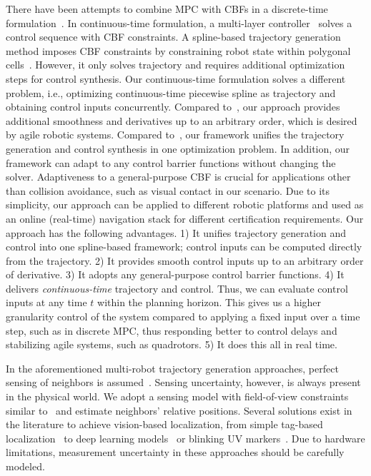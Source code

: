 There have been attempts to combine MPC with CBFs in a discrete-time formulation~\cite{liu2023iterative, zeng2021safety}. In continuous-time formulation, a multi-layer controller~\cite{sforni2024receding} solves a control sequence with CBF constraints. A spline-based trajectory generation method imposes CBF constraints by constraining robot state within polygonal cells~\cite{dickson2024spline}. However, it only solves trajectory and requires additional optimization steps for control synthesis. 
Our continuous-time formulation solves a different problem, i.e., optimizing continuous-time piecewise spline as trajectory and obtaining control inputs concurrently. Compared to~\cite{sforni2024receding}, our approach provides additional smoothness and derivatives up to an arbitrary order, which is desired by agile robotic systems. Compared to~\cite{dickson2024spline}, our framework unifies the trajectory generation and control synthesis in one optimization problem. In addition, our framework can adapt to any control barrier functions without changing the solver. Adaptiveness to a general-purpose CBF is crucial for applications other than collision avoidance, such as visual contact in our scenario. Due to its simplicity, our approach can be applied to different robotic platforms and used as an online (real-time) navigation stack for different certification requirements.
Our approach has the following advantages. 1) It unifies  trajectory generation and control into one spline-based framework; control inputs can be computed directly from the trajectory. 2) It provides smooth control inputs up to an arbitrary order of derivative. 3) It adopts any general-purpose control barrier functions. 4) It delivers \emph{continuous-time} trajectory and control. Thus, we can evaluate control inputs at any time $t$ within the planning horizon. This gives us a higher granularity control of the system compared to applying a fixed input over a time step, such as in discrete MPC, thus responding better to control delays and stabilizing agile systems, such as quadrotors. 5) It does this all in real time. 

In the aforementioned multi-robot trajectory generation approaches, perfect sensing of neighbors is assumed~\cite{csenbacslar2023rlss, zhou2017fast}. Sensing uncertainty, however, is always present in the physical world. We adopt a sensing model with field-of-view constraints similar to~\cite{catellani2023distributed} and estimate neighbors' relative positions. Several solutions exist in the literature to achieve vision-based localization, from simple tag-based localization~\cite{malyuta2020long} to deep learning models~\cite{ge2022vision} or blinking UV markers~\cite{walter2019uvdar}. Due to hardware limitations, measurement uncertainty in these approaches should be carefully modeled.